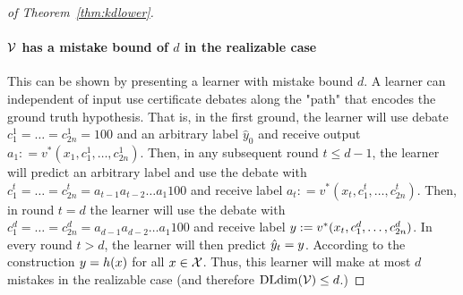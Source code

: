 \documentclass[anon]{alt2027} %
\begin{document}
\begin{proof}[of Theorem~\ref{thm:kdlower}]
    \paragraph{${\mathcal V}$ has a mistake bound of $d$ in the realizable case} This can be shown by presenting a learner with mistake bound $d$. A learner can independent of input use certificate debates along the "path" that encodes the ground truth hypothesis. That is, in the first ground, the learner will use debate $c_1^1 = \dots = c_{2n}^1 = {100}$ and an arbitrary label $\hat{y}_0$ and receive output $a_1 : = v^* (x_1, c_1^1, \dots, c_{2n}^1)$. Then, in any subsequent round $t \leq d-1$, the learner will predict an arbitrary label and use the debate with $c_{1}^t = \dots = c_{2n}^t  = {a_{t-1} a_{t-2} \dots a_1 1 0 0}$ and receive label $a_{t} : = v^*(x_t,c_1^t, \dots, c_{2n}^t )$. 
 Then, in round $t = d $ the learner will use the debate with $c_{1}^d = \dots = c_{2n}^d  = {a_{d-1} a_{d-2} \dots a_1 1 0 0}$ and receive label $y : = v^*(x_t,c_1^d, \dots, c_{2n}^d )$.
 In every round $t > d$, the learner will then predict $\hat{y}_t= y$. According to the construction $y = h(x)$ for all $x\in {\mathcal X}$. Thus, this learner will make at most $d$ mistakes in the realizable case (and therefore  $\mathrm{DLdim}({\mathcal V}) \leq d$.)
\newcommand{\fat}{\textrm{fat}}

\end{proof}
\end{document}
